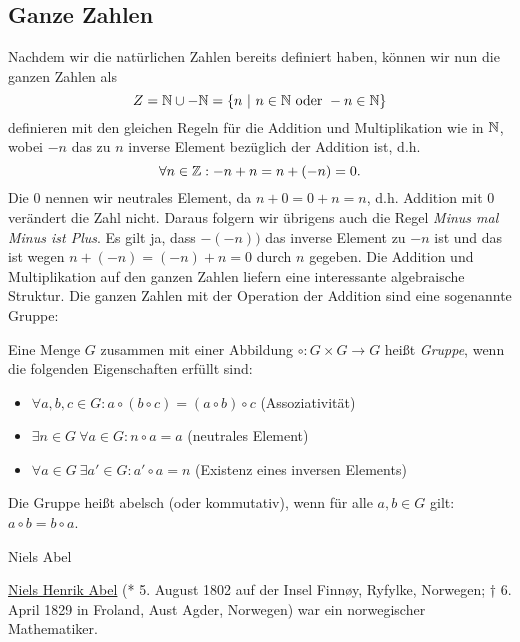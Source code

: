 \subsection{Ganze Zahlen}
\label{\detokenize{grundlagen/zahlensysteme:ganze-zahlen}}
Nachdem wir die natürlichen Zahlen bereits definiert haben, können wir nun die ganzen Zahlen als
\begin{equation*}
 Z = \mathbb{N} \cup -\mathbb{N} = \{n ~|~n \in \mathbb{N} \text{ oder } -n \in \mathbb{N} \}
\end{equation*}
definieren mit den gleichen Regeln für die Addition und Multiplikation wie in \(\mathbb{N}\), wobei \(-n\) das zu \(n\) inverse Element bezüglich der Addition ist, d.h.
\begin{equation*}
\forall n \in \mathbb{Z}: -n + n = n + (-n) = 0.
\end{equation*}
Die \(0\) nennen wir neutrales Element, da \(n+0=0+n=n\), d.h. Addition mit \(0\) verändert die Zahl nicht.
Daraus folgern wir übrigens auch die Regel \emph{Minus mal Minus ist Plus}. Es gilt ja, dass \(-(-n))\) das inverse Element zu \(-n\) ist und das ist wegen \(n+(-n) = (-n)+n=0\) durch \(n\) gegeben.
Die Addition und Multiplikation auf den ganzen Zahlen liefern eine interessante algebraische Struktur.
Die ganzen Zahlen mit der Operation der Addition sind eine sogenannte Gruppe:
\label{grundlagen/zahlensysteme:definition-4}
\begin{definition}{}{}



Eine Menge \(G\) zusammen mit einer Abbildung \(\circ: G \times G \rightarrow G\) heißt \emph{Gruppe}, wenn die folgenden Eigenschaften erfüllt sind:
\begin{itemize}
\item {} 
\( \forall a,b,c \in G: a \circ (b \circ c) = (a\circ b) \circ c\) (Assoziativität)

\item {} 
\(\exists n \in G~ \forall a \in G: n \circ a = a\) (neutrales Element)

\item {} 
\(\forall a \in G~\exists a' \in G: a' \circ a = n\) (Existenz eines inversen Elements)

\end{itemize}

Die Gruppe heißt abelsch (oder kommutativ), wenn für alle \(a,b \in G\) gilt: \(a \circ b = b \circ a\).
\end{definition}

\begin{emphBox}{Niels Abel}{}

\href{https://de.wikipedia.org/wiki/Niels\_Henrik\_Abel}{Niels Henrik Abel} (* 5. August 1802 auf der Insel Finnøy, Ryfylke, Norwegen; † 6. April 1829 in Froland, Aust Agder, Norwegen) war ein norwegischer Mathematiker.
\end{emphBox}

